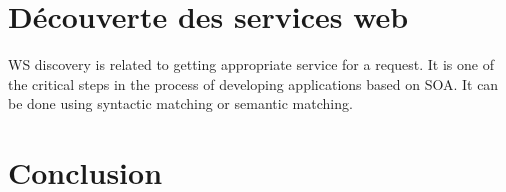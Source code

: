 \section{Découverte des services web}

WS discovery is related to getting appropriate service for a
request. It is one of the critical steps in the process of developing
applications based on SOA. It can be done using syntactic matching or
semantic matching\cite{Omer2011}.\\
\newpage

\section{Conclusion}
\newpage


